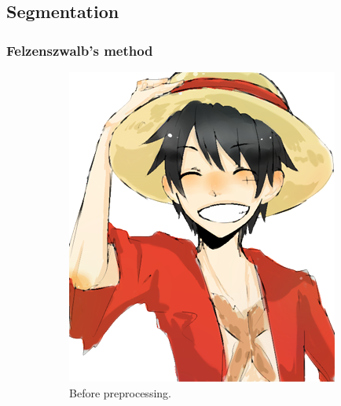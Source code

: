 \subsection{Segmentation}
\subsubsection{Felzenszwalb's method}
\begin{figure}[htb!]
\begin{subfigure}{.3\textwidth}
\includegraphics[width=\textwidth]{images/rufy_d.png}
\caption{Before preprocessing.}
\end{subfigure}
\begin{subfigure}{.3\textwidth}

\end{subfigure}
\end{figure}
